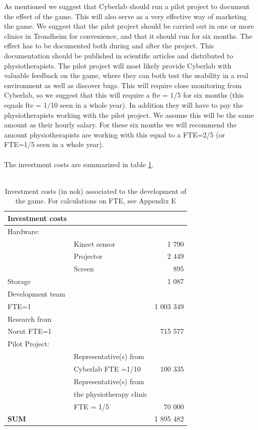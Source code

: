 As mentioned we suggest that Cyberlab should run a pilot project to document the effect of the game. This will also serve as a very effective way of marketing the game. We suggest that the pilot project should be carried out in one or more clinics in Trondheim for convenience, and that it should run for six months. The effect has to be documented both during and after the project. This documentation should be published in scientific articles and distributed to physiotherapists. The pilot project will most likely provide Cyberlab with valuable feedback on the game, where they can both test the usability in a real environment as well as discover bugs. This will require close monitoring from Cyberlab, so we suggest that this will require a \ac{fte} = 1/5 for  six months (this equals \ac{fte} = 1/10 seen in a whole year). In addition they will have to pay the physiotherapists working with the pilot project. We assume this will be the same amount as their hourly salary. For these six months we will recommend the amount physiotherapists are working with this equal to a FTE=2/5 (or FTE=1/5 seen in a whole year).\\ \\
The investment costs are summarized in table \ref{tab:investmentcosts}.\\ \\
\begin{table}
\centering
    \begin{tabular}{|l|l|r|}
        \hline
       \textbf{Investment costs}  & &\\ \hline
       Hardware: & & \\ \hline
	   & Kinect sensor & 1 790  \\ \hline
	   & Projector & 2 449 \\ \hline
	   & Screen & 895 \\ \hline
	   Storage & & 1 087 \\ \hline
	   Development team & & \\  
	   FTE=1 &  & 1 003 349   \\ \hline
	   Research from & & \\ 
	   Norut FTE=1 & & 715 577 \\ \hline
	   Pilot Project: & & \\ \hline
	   & Representative(s) from & \\
	   & Cyberlab FTE =1/10 & 100 335  \\ \hline
	   & Representative(s) from & \\
	   & the physiotherapy clinic & \\
	   & FTE = 1/5 & 70 000  \\ \hline
	   \textbf{SUM} & & 1 895 482 
 \\ \hline
    \end{tabular}
    \caption[Investment costs associated to the development of the game]{Investment costs (in \ac{nok}) associated to the development of the game. For calculations on FTE, see Appendix E}
    \label{tab:investmentcosts}
\end{table}
